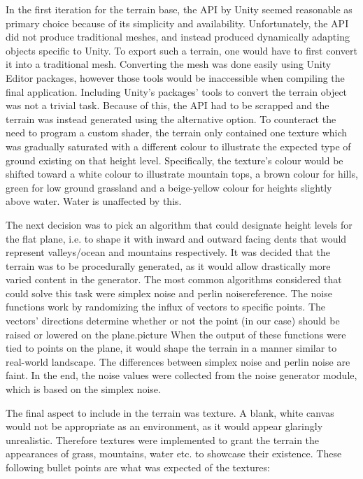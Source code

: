 In the first iteration for the terrain base, the API by Unity seemed reasonable as primary choice because of its simplicity and availability.
Unfortunately, the API did not produce traditional meshes, and instead produced dynamically adapting objects specific to Unity.
To export such a terrain, one would have to first convert it into a traditional mesh.
Converting the mesh was done easily using Unity Editor packages, however those tools would be inaccessible when compiling the final application.
Including Unity’s packages’ tools to convert the terrain object was not a trivial task.
Because of this, the API had to be scrapped and the terrain was instead generated using the alternative option.
To counteract the need to program a custom shader, the terrain only contained one texture which was gradually saturated with a different colour to illustrate the expected type of ground existing on that height level.
Specifically, the texture’s colour would be shifted toward a white colour to illustrate mountain tops, a brown colour for hills, green for low ground grassland and a beige-yellow colour for heights slightly above water. Water is unaffected by this.

The next decision was to pick an algorithm that could designate height levels for the flat plane, i.e. to shape it with inward and outward facing dents that would represent valleys/ocean and mountains respectively.
It was decided that the terrain was to be procedurally generated, as it would allow drastically more varied content in the generator.
The most common algorithms considered that could solve this task were simplex noise and perlin noise{reference}.
The noise functions work by randomizing the influx of vectors to specific points.
The vectors’ directions determine whether or not the point (in our case) should be raised or lowered on the plane.{picture}
When the output of these functions were tied to points on the plane, it would shape the terrain in a manner similar to real-world landscape.
The differences between simplex noise and perlin noise are faint. In the end, the noise values were collected from the noise generator module, which is based on the simplex noise.

The final aspect to include in the terrain was texture.
A blank, white canvas would not be appropriate as an environment, as it would appear glaringly unrealistic.
Therefore textures were implemented to grant the terrain the appearances of grass, mountains, water etc. to showcase their existence.
These following bullet points are what was expected of the textures:

